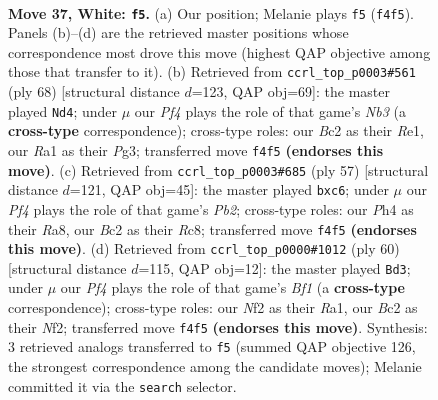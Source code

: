 \documentclass[11pt]{article}
\begin{document}
\clearpage

\begin{figure}[p]\centering
\begin{subfigure}{0.46\textwidth}\centering
\resizebox{\linewidth}{!}{%
\newchessgame
\chessboard[
  setfen={4rb2/3kn1pr/4n1b1/7p/P3pP1P/6R1/2B2NP1/R2K2N1 w - - 3 37},
  showmover=false,
  pgfstyle=straightmove, color=movearrow, markmove={f4-f5}
]}
\caption{}
\end{subfigure}\hfill
\begin{subfigure}{0.46\textwidth}\centering
\resizebox{\linewidth}{!}{%
\newchessgame
\chessboard[
  setfen={4r1k1/5pp1/r4n2/3b4/1p2p3/1N4PP/1P1R1PB1/4R1K1 w - - 4 35},
  showmover=false,
  pgfstyle=straightmove, color=movearrow, markmove={b3-d4}
]}
\caption{}
\end{subfigure}
\\[4pt]
\begin{subfigure}{0.46\textwidth}\centering
\resizebox{\linewidth}{!}{%
\newchessgame
\chessboard[
  setfen={r1r3k1/1p1nbpp1/1BP5/P7/2NN2b1/7p/4P2P/2RR2K1 b - - 0 29},
  showmover=false,
  pgfstyle=straightmove, color=movearrow, markmove={b7-c6}
]}
\caption{}
\end{subfigure}\hfill
\begin{subfigure}{0.46\textwidth}\centering
\resizebox{\linewidth}{!}{%
\newchessgame
\chessboard[
  setfen={5bk1/1b2r1pp/p7/P2p4/3B4/2P1n3/5NPP/R4B1K w - - 4 31},
  showmover=false,
  pgfstyle=straightmove, color=movearrow, markmove={f1-d3}
]}
\caption{}
\end{subfigure}
\caption{\textbf{Move 37, White: \texttt{f5}.} (a) Our position; Melanie plays \texttt{f5} (\texttt{f4f5}). Panels (b)--(d) are the retrieved master positions whose correspondence most drove this move (highest QAP objective among those that transfer to it). (b) Retrieved from \texttt{ccrl\_top\_p0003\#561} (ply 68) [structural distance $d$=123, QAP obj=69]: the master played \texttt{Nd4}; under $\mu$ our \emph{Pf4} plays the role of that game's \emph{Nb3} (a \textbf{cross-type} correspondence); cross-type roles: our \emph{B}c2 as their \emph{R}e1, our \emph{R}a1 as their \emph{P}g3; transferred move \texttt{f4f5} \textbf{(endorses this move)}. (c) Retrieved from \texttt{ccrl\_top\_p0003\#685} (ply 57) [structural distance $d$=121, QAP obj=45]: the master played \texttt{bxc6}; under $\mu$ our \emph{Pf4} plays the role of that game's \emph{Pb2}; cross-type roles: our \emph{P}h4 as their \emph{R}a8, our \emph{B}c2 as their \emph{R}c8; transferred move \texttt{f4f5} \textbf{(endorses this move)}. (d) Retrieved from \texttt{ccrl\_top\_p0000\#1012} (ply 60) [structural distance $d$=115, QAP obj=12]: the master played \texttt{Bd3}; under $\mu$ our \emph{Pf4} plays the role of that game's \emph{Bf1} (a \textbf{cross-type} correspondence); cross-type roles: our \emph{N}f2 as their \emph{R}a1, our \emph{B}c2 as their \emph{N}f2; transferred move \texttt{f4f5} \textbf{(endorses this move)}. Synthesis: 3 retrieved analogs transferred to \texttt{f5} (summed QAP objective 126, the strongest correspondence among the candidate moves); Melanie committed it via the \texttt{search} selector.}
\label{fig:thought-m72}
\end{figure}
\end{document}
